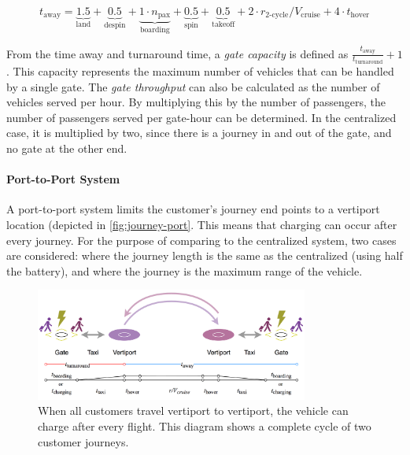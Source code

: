 \begin{equation}\label{eq:boardingOffport}
    t_\text{away} = \underbrace{1.5}_\text{land}+\underbrace{0.5}_\text{despin}+\underbrace{1\cdot n_\text{pax}}_\text{boarding} +\underbrace{0.5}_\text{spin}+\underbrace{0.5}_\text{takeoff} + 2\cdot r_\text{2-cycle}/V_\text{cruise} + 4\cdot t_\text{hover}
\end{equation}

From the time away and turnaround time, a \textit{gate capacity} is defined as $\frac{t_\text{away}}{t_\text{turnaround}} + 1$. This capacity represents the maximum number of vehicles that can be handled by a single gate. The \textit{gate throughput} can also be calculated as the number of vehicles served per hour. By multiplying this by the number of passengers, the number of passengers served per gate-hour can be determined. In the centralized case, it is multiplied by two, since there is a journey in and out of the gate, and no gate at the other end.

\paragraph{Port-to-Port System}
A port-to-port system limits the customer's journey end points to a vertiport location (depicted in \autoref{fig:journey-port}. This means that charging can occur after every journey. For the purpose of comparing to the centralized system, two cases are considered: where the journey length is the same as the centralized (using half the battery), and where the journey is the maximum range of the vehicle.

\begin{figure}[h]
    \centering
    \includegraphics[width=0.8\textwidth]{Figures/journey-port-port.png}
    \captionsetup{justification=centering}
    \caption{When all customers travel vertiport to vertiport, the vehicle can charge after every flight. This diagram shows a complete cycle of two customer journeys.}
    \label{fig:journey-port}
\end{figure}

